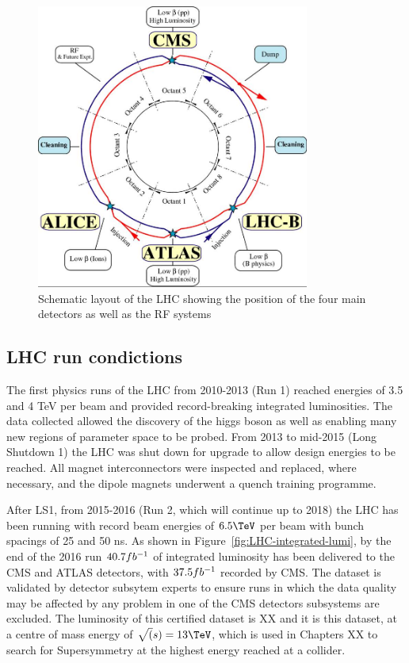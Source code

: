 \begin{figure}
\centering
    \includegraphics[width=0.8\textwidth]{./Figures/detector/lhcDiagram}
  \caption{Schematic layout of the LHC showing the position of the four main detectors as
  well as the RF systems}
  \label{fig:LHC-diagram}
\end{figure}

\subsection{LHC run condictions}

The first physics runs of the LHC from 2010-2013 (Run 1) reached energies of 3.5 and 4 TeV per beam and 
provided record-breaking integrated luminosities. The data collected allowed the 
discovery of the higgs boson \cite{higgs} as well as enabling many new regions of parameter space
to be probed. From 2013 to mid-2015 (Long Shutdown 1) the LHC was shut down for upgrade to allow design
energies to be reached. All magnet interconnectors were inspected and replaced, where necessary,
and the dipole magnets underwent a quench training programme. 

After LS1, from 2015-2016 (Run 2, which will continue up to 2018) the LHC has been running with record beam energies 
of $6.5\TeV$ per beam with bunch spacings of 25 and 50 ns. 
As shown in Figure~\ref{fig:LHC-integrated-lumi}, by the end of the 2016 run $40.7fb^{-1}$ of integrated luminosity has been 
delivered to the CMS and ATLAS detectors, with $37.5fb^{-1}$ recorded by CMS. The dataset is validated by detector
subsytem experts to ensure runs in which the data quality may be affected by any problem in one of the CMS detectors 
subsystems are excluded. The luminosity of this certified dataset is XX and it is this dataset, 
at a centre of mass energy of $\sqrt(s) = 13\TeV$, 
which is used in Chapters XX to search for Supersymmetry at the highest energy reached at a collider.

